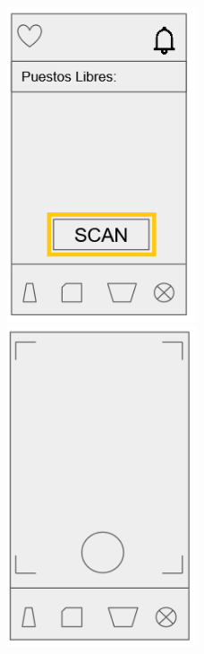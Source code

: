 \documentclass[12pt]{article}
\begin{document}
\begin{figure}[!h]
\centering

	\includegraphics[width=0.5\textwidth]{reservaSitio1.png} 
\endminipage
{}
	\includegraphics[width=0.5\textwidth]{reservaSitio2.png} 
\endminipage

\medskip


\end{figure}
\end{document}
